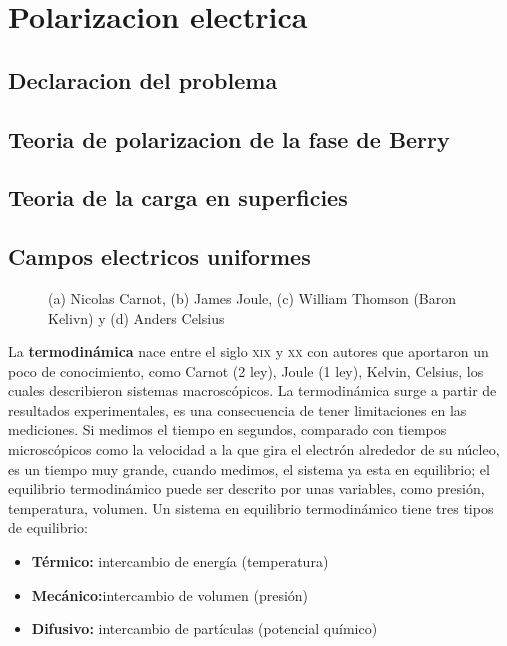 \documentclass[11pt,fleqn]{book}
\begin{document}
\chapter{Polarizacion electrica}
\section{Declaracion del problema}
\section{Teoria de polarizacion de la fase de Berry}
\section{Teoria de la carga en superficies}
\section{Campos electricos uniformes}
        




\begin{figure}[H]
    \centering
    \caption{(a) Nicolas Carnot, (b) James Joule, (c) William Thomson (Baron Kelivn) y (d) Anders Celsius}
\end{figure}

La \textbf{termodinámica} nace entre el siglo \textsc{xix} y \textsc{xx} con autores que aportaron un poco de conocimiento, como Carnot (2 ley), Joule (1 ley), Kelvin, Celsius, los cuales describieron sistemas macroscópicos. La termodinámica surge a partir de resultados experimentales, es una consecuencia de tener limitaciones en las mediciones. Si medimos el tiempo en segundos, comparado con tiempos microscópicos como la velocidad a la que gira el electrón alrededor de su núcleo, es un tiempo muy grande, cuando medimos, el sistema ya esta en equilibrio; el equilibrio termodinámico puede ser descrito por unas variables, como presión, temperatura, volumen. Un sistema en equilibrio termodinámico tiene tres tipos de equilibrio:

\begin{itemize}
    \item \textbf{Térmico:} intercambio de energía (temperatura)
    \item \textbf{Mecánico:}intercambio de volumen (presión)
    \item \textbf{Difusivo:} intercambio de partículas (potencial químico)
\end{itemize}
     
\end{document}
